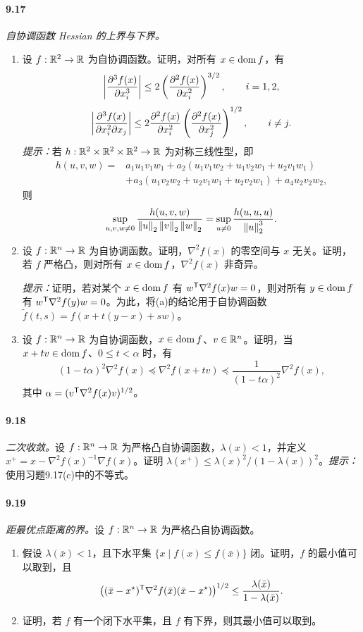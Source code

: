 \paragraph{9.17} \emph{自协调函数 Hessian 的上界与下界。}
\begin{enumerate}[label=(\alph*)]
\item 设 $f:\mathbb R^2\to\mathbb R$ 为自协调函数。证明，对所有 $x\in\operatorname{dom} f$，有
\[
 \left\lvert \frac{\partial^3f(x)}{\partial x_i^3}\right\rvert
 \le2\left(\frac{\partial^2f(x)}{\partial x_i^2}\right)^{3/2},\qquad i=1,2,
\]
\[
 \left\lvert \frac{\partial^3f(x)}{\partial x_i^2\partial x_j}\right\rvert
 \le2\frac{\partial^2f(x)}{\partial x_i^2}
 \left(\frac{\partial^2f(x)}{\partial x_j^2}\right)^{1/2},\qquad i\ne j.
\]
\emph{提示：}若 $h:\mathbb R^2\times\mathbb R^2\times\mathbb R^2\to\mathbb R$ 为对称三线性型，即
\[
\begin{aligned}
 h(u,v,w)={}&a_1u_1v_1w_1+a_2(u_1v_1w_2+u_1v_2w_1+u_2v_1w_1)\\
 &+a_3(u_1v_2w_2+u_2v_1w_1+u_2v_2w_1)+a_4u_2v_2w_2,
\end{aligned}
\]
则
\[
 \sup_{u,v,w\ne0}\frac{h(u,v,w)}{\left\lVert u\right\rVert_2\left\lVert v\right\rVert_2\left\lVert w\right\rVert_2}
 =\sup_{u\ne0}\frac{h(u,u,u)}{\left\lVert u\right\rVert_2^3}.
\]
\item 设 $f:\mathbb R^n\to\mathbb R$ 为自协调函数。证明，$\nabla^2f(x)$ 的零空间与 $x$ 无关。证明，若 $f$ 严格凸，则对所有 $x\in\operatorname{dom} f$，$\nabla^2f(x)$ 非奇异。

\emph{提示：}证明，若对某个 $x\in\operatorname{dom} f$ 有 $w^\mathsf T\nabla^2f(x)w=0$，则对所有 $y\in\operatorname{dom} f$ 有 $w^\mathsf T\nabla^2f(y)w=0$。为此，将(a)的结论用于自协调函数 $\widetilde f(t,s)=f(x+t(y-x)+sw)$。
\item 设 $f:\mathbb R^n\to\mathbb R$ 为自协调函数，$x\in\operatorname{dom} f$、$v\in\mathbb R^n$。证明，当 $x+tv\in\operatorname{dom} f$、$0\le t<\alpha$ 时，有
\[
 (1-t\alpha)^2\nabla^2f(x)\preceq\nabla^2f(x+tv)
 \preceq\frac1{(1-t\alpha)^2}\nabla^2f(x),
\]
其中 $\alpha=(v^\mathsf T\nabla^2f(x)v)^{1/2}$。
\end{enumerate}

\paragraph{9.18} \emph{二次收敛。}设 $f:\mathbb R^n\to\mathbb R$ 为严格凸自协调函数，$\lambda(x)<1$，并定义 $x^+=x-\nabla^2f(x)^{-1}\nabla f(x)$。证明 $\lambda(x^+)\le\lambda(x)^2/(1-\lambda(x))^2$。\emph{提示：}使用习题9.17(c)中的不等式。

\paragraph{9.19} \emph{距最优点距离的界。}设 $f:\mathbb R^n\to\mathbb R$ 为严格凸自协调函数。
\begin{enumerate}[label=(\alph*)]
\item 假设 $\lambda(\bar x)<1$，且下水平集 $\{x\mid f(x)\le f(\bar x)\}$ 闭。证明，$f$ 的最小值可以取到，且
\[
 \bigl((\bar x-x^\star)^\mathsf T\nabla^2f(\bar x)(\bar x-x^\star)\bigr)^{1/2}
 \le\frac{\lambda(\bar x)}{1-\lambda(\bar x)}.
\]
\item 证明，若 $f$ 有一个闭下水平集，且 $f$ 有下界，则其最小值可以取到。
\end{enumerate}

